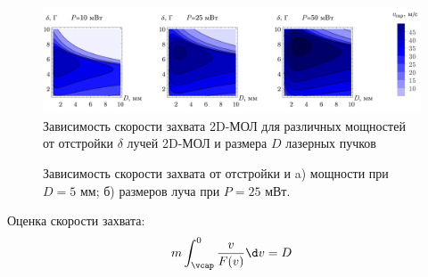 \begin{minipage}{0.65\textwidth}

\begin{figure}[ht]
    \centering
    \includegraphics[width=1.0\textwidth]{../MOT/figs/vcap2d_delta-Ds.png}
    \caption{Зависимость скорости захвата 2D-МОЛ для различных мощностей от отстройки $\delta$ лучей 2D-МОЛ и размера $D$ лазерных пучков}
\end{figure}

\vspace{-1cm}
\begin{figure}[htb]
    \centering
    \hspace{10 mm} 
    \vspace{-3mm}
    \caption{Зависимость скорости захвата от отстройки 
    и a) мощности при $D=5$ мм; б) размеров луча при $P = 25$ мВт.
    }
\end{figure}


\end{minipage}
\hfill
\begin{minipage}{0.31\textwidth}

Оценка скорости захвата:
\begin{equation*}
    m \int_{\vcap}^{0} \frac{v}{F(v)} \d v = D
\end{equation*}

\end{minipage}